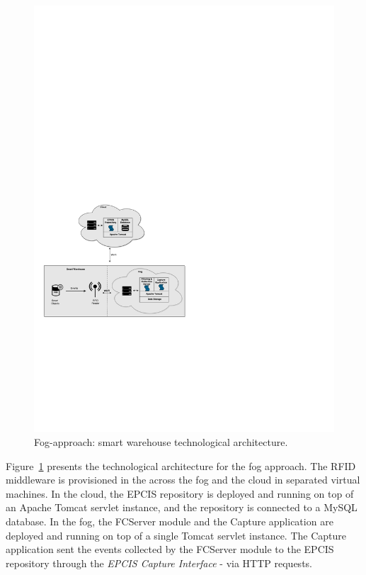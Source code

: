 \begin{figure}[ht!]
  \centering
  \includegraphics[width=\textwidth]{./images/implementation_fog_architecture}
  \caption{Fog-approach: smart warehouse technological architecture.}
  \label{fig:implementation_fog_architecture}
\end{figure}

Figure~\ref{fig:implementation_fog_architecture} presents the technological architecture for the fog
approach. The \gls{RFID} middleware is provisioned in the across the fog and the cloud in separated
virtual machines. In the cloud, the \gls{EPCIS} repository is deployed and running on top of an Apache
Tomcat servlet instance, and the repository is connected to a MySQL database. In the fog, the \gls{FCServer}
module and the Capture application are deployed and running on top of a single Tomcat servlet instance.
The Capture application sent the events collected by the \gls{FCServer} module to the \gls{EPCIS} repository
through the \textit{\gls{EPCIS} Capture Interface} - via \gls{HTTP} requests.\\

